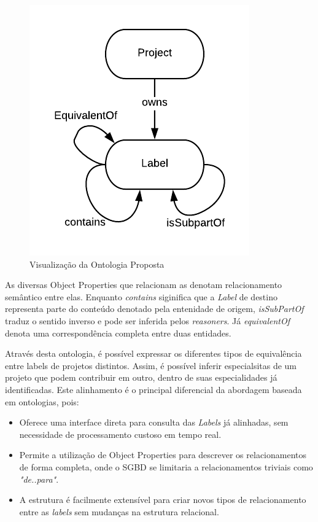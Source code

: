 \documentclass[sigconf]{acmart}
\begin{document}
\begin{figure}[!htbp]
\centering
 \includegraphics[width=\columnwidth]{ontologia}
 \caption{Visualização da Ontologia Proposta}\label{fig:ontologia}
\end{figure}

As diversas Object Properties que relacionam as  denotam relacionamento semântico entre elas. Enquanto \textit{contains} siginifica que a \textit{Label} de destino representa parte do conteúdo denotado pela entenidade de origem, \textit{isSubPartOf} traduz o sentido inverso e pode ser inferida pelos \textit{reasoners}. Já \textit{equivalentOf} denota uma correspondência completa entre duas entidades.

Através desta ontologia, é possível expressar os diferentes tipos de equivalência entre labels de projetos distintos. Assim, é possível inferir especialsitas de um projeto que podem contribuir em outro, dentro de suas especialidades já identificadas. Este alinhamento é o principal diferencial da abordagem baseada em ontologias, pois:

\begin{itemize}
  \item Oferece uma interface direta para consulta das \textit{Labels} já alinhadas, sem necessidade de processamento custoso em tempo real.
  \item Permite a utilização de Object Properties para descrever os relacionamentos de forma completa, onde o SGBD se limitaria a relacionamentos triviais como \textit{"de..para"}.
  \item A estrutura é facilmente extensível para criar novos tipos de relacionamento entre as \textit{labels} sem mudanças na estrutura relacional.
\end{itemize}
\end{document}
